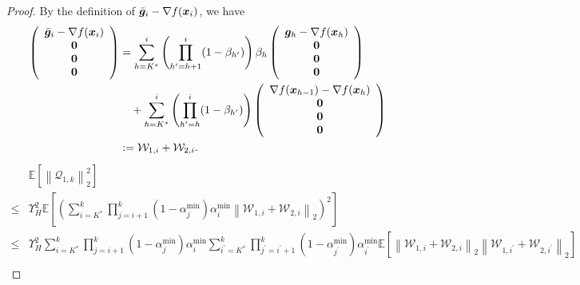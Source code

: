 \documentclass[aos]{imsart}
\numberwithin{equation}{section}
\theoremstyle{plain}
\begin{document}
\begin{appendix}
\begin{proof}
By the definition of $\Bar{\bm{g}}_{i} - \nabla f(\bm{x}_i)$, we have 
    \begin{equation*}
        \begin{split}
         \left( \begin{array}{c}
            \Bar{\bm{g}}_{i} - \nabla f(\bm{x}_i) \\
            \bm{0}  \\
            \bm{0} \\
            \bm{0}
         \end{array} \right)
            & =  \sum_{h=K^{*}}^{i} \left( \prod_{h^{\prime}=h+1}^{i} (1-\beta_{h^{\prime}}) \right) \beta_h \left( \begin{array}{c}
                \bm{g}_{h} - \nabla f(\bm{x}_{h}) \\
                \bm{0}  \\
                \bm{0} \\
                \bm{0}
            \end{array} \right) \\
            & \hspace{1em} + \sum_{h=K^{*}}^{i} \left( \prod_{h^{\prime}=h}^{i} (1-\beta_{h^{\prime}}) \right) \left( \begin{array}{c}
                \nabla f(\bm{x}_{h-1}) - \nabla f(\bm{x}_{h}) \\
                \bm{0}  \\
                \bm{0} \\
                \bm{0}
            \end{array} \right) \\
            & :=  \mathcal{W}_{1,i} + \mathcal{W}_{2,i}.
        \end{split}
    \end{equation*}
    \begin{equation}
        \begin{split}
            & \mathbb{E} \left[ \left\| \mathcal{Q}_{1,k}\right\|_2^2  \right]\\
            \leq & \Upsilon_{H}^2 \mathbb{E} \left[\left(\sum_{i = K^{*}}^{k} \prod_{j=i+1}^{k} \left( 1-\alpha^{\min}_j \right) \alpha^{\min}_i \left\| \mathcal{W}_{1,i} + \mathcal{W}_{2,i} \right\|_2 \right)^2\right] \\
            \leq & \Upsilon_{H}^2 \sum_{i = K^{*}}^{k} \prod_{j=i+1}^{k} \left( 1-\alpha^{\min}_j \right) \alpha^{\min}_i \sum_{i^{\prime} = K^{*}}^{k} \prod_{j^{\prime}=i^{\prime}+1}^{k} \left( 1-\alpha^{\min}_{j^{\prime}} \right) \alpha^{\min}_{i^{\prime}} \mathbb{E} \left[ \left\| \mathcal{W}_{1,i} + \mathcal{W}_{2,i} \right\|_2 \left\| \mathcal{W}_{1,i^{\prime}} + \mathcal{W}_{2,i^{\prime}} \right\|_2 \right] \\

\end{split}
\end{equation}
\end{proof}
\end{appendix}
\end{document}
